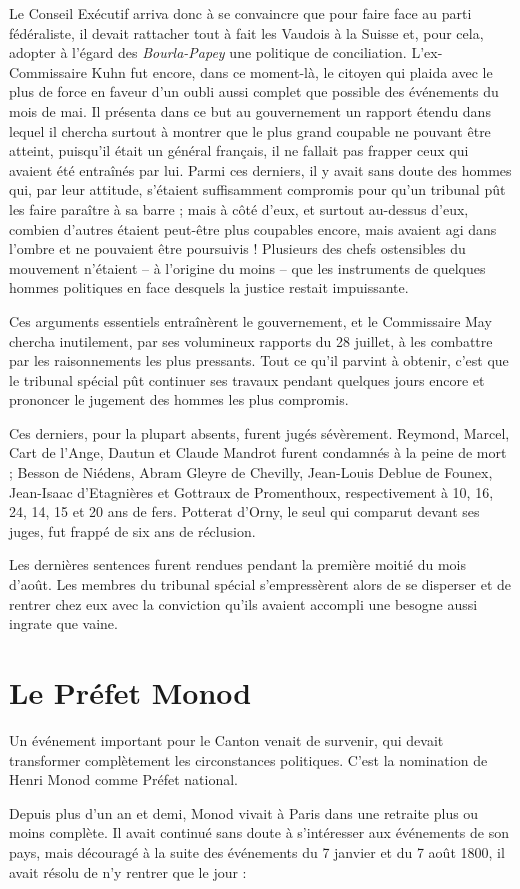 \documentclass[french,twoside]{book} %
\begin{document}
Le Conseil Exécutif arriva donc à se convaincre que pour faire face au parti fédéraliste, il devait rattacher tout à fait les Vaudois à la Suisse et, pour cela, adopter à l’égard des \emph{Bourla-Papey} une politique de conciliation. L’ex-Commissaire Kuhn fut encore, dans ce moment-là, le citoyen qui plaida avec le plus de force en faveur d’un oubli aussi complet que possible des événements du mois de mai. Il présenta dans ce but au gouvernement un rapport étendu dans lequel il chercha surtout à montrer que le plus grand coupable ne pouvant être atteint, puisqu’il était un général français, il ne fallait pas frapper ceux qui avaient été entraînés par lui. Parmi ces derniers, il y avait sans doute des hommes qui, par leur attitude, s’étaient suffisamment compromis pour qu’un tribunal pût les faire paraître à sa barre ; mais à côté d’eux, et surtout au-dessus d’eux, combien d’autres étaient peut-être plus coupables encore, mais avaient agi dans l’ombre et ne pouvaient être poursuivis ! Plusieurs des chefs ostensibles du mouvement n’étaient – à l’origine du moins – que les instruments de quelques hommes politiques en face desquels la justice restait impuissante.\par
Ces arguments essentiels entraînèrent le gouvernement, et le Commissaire May chercha inutilement, par ses volumineux rapports du 28 juillet, à les combattre par les raisonnements les plus pressants. Tout ce qu’il parvint à obtenir, c’est que le tribunal spécial pût continuer ses travaux pendant quelques jours encore et prononcer le jugement des hommes les plus compromis.\par
Ces derniers, pour la plupart absents, furent jugés sévèrement. Reymond, Marcel, Cart de l’Ange, Dautun et Claude Mandrot furent condamnés à la peine de mort ; Besson de Niédens, Abram Gleyre de Chevilly, Jean-Louis Deblue de Founex, Jean-Isaac d’Etagnières et Gottraux de Promenthoux, respectivement à 10, 16, 24, 14, 15 et 20 ans de fers. Potterat d’Orny, le seul qui comparut devant ses juges, fut frappé de six ans de réclusion.\par
Les dernières sentences furent rendues pendant la première moitié du mois d’août. Les membres du tribunal spécial s’empressèrent alors de se disperser et de rentrer chez eux avec la conviction qu’ils avaient accompli une besogne aussi ingrate que vaine.
\section[Le Préfet Monod]{Le Préfet Monod}
\noindent Un événement important pour le Canton venait de survenir, qui devait transformer complètement les circonstances politiques. C’est la nomination de Henri Monod comme Préfet national.\par
Depuis plus d’un an et demi, Monod vivait à Paris dans une retraite plus ou moins complète. Il avait continué sans doute à s’intéresser aux événements de son pays, mais découragé à la suite des événements du 7 janvier et du 7 août 1800, il avait résolu de n’y rentrer que le jour :\par
\end{document}
